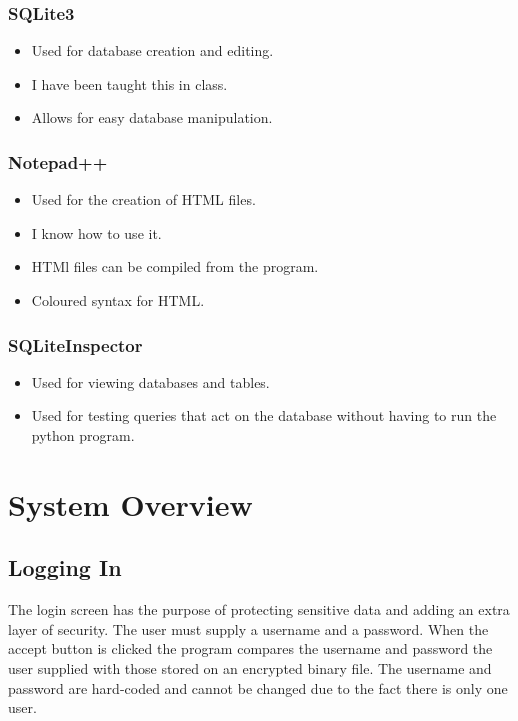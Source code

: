 \subsubsection{SQLite3}

\begin{itemize}
	\item Used for database creation and editing.
	\item I have been taught this in class.
	\item Allows for easy database manipulation.
\end{itemize}

\subsubsection{Notepad++}

\begin{itemize}
	\item Used for the creation of HTML files.
	\item I know how to use it.
	\item HTMl files can be compiled from the program.
	\item Coloured syntax for HTML.
\end{itemize}

\subsubsection{SQLiteInspector}

\begin{itemize}
	\item Used for viewing databases and tables.
	\item Used for testing queries that act on the database without having to run the python program.
\end{itemize}

\section{System Overview}

\subsection{Logging In}
The login screen has the purpose of protecting sensitive data and adding an extra layer of security. The user must supply a username and a password. When the accept button is clicked the program compares the username and password the user supplied with those stored on an encrypted binary file. The username and password are hard-coded and cannot be changed due to the fact there is only one user.

